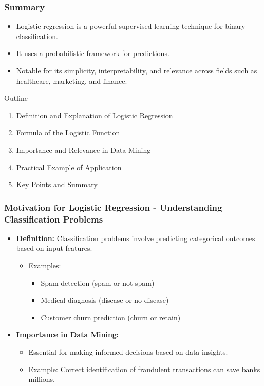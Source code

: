 \documentclass[aspectratio=169]{beamer}
\begin{document}
\begin{frame}[fragile]
    \frametitle{Summary}
    \begin{itemize}
        \item Logistic regression is a powerful supervised learning technique for binary classification.
        \item It uses a probabilistic framework for predictions.
        \item Notable for its simplicity, interpretability, and relevance across fields such as healthcare, marketing, and finance.
    \end{itemize}
    \begin{block}{Outline}
        \begin{enumerate}
            \item Definition and Explanation of Logistic Regression
            \item Formula of the Logistic Function
            \item Importance and Relevance in Data Mining
            \item Practical Example of Application
            \item Key Points and Summary
        \end{enumerate}
    \end{block}
\end{frame}

\begin{frame}[fragile]
    \frametitle{Motivation for Logistic Regression - Understanding Classification Problems}
    \begin{itemize}
        \item \textbf{Definition:} Classification problems involve predicting categorical outcomes based on input features.
        \begin{itemize}
            \item Examples: 
            \begin{itemize}
                \item Spam detection (spam or not spam)
                \item Medical diagnosis (disease or no disease)
                \item Customer churn prediction (churn or retain)
            \end{itemize}
        \end{itemize}
        \item \textbf{Importance in Data Mining:} 
        \begin{itemize}
            \item Essential for making informed decisions based on data insights.
            \item Example: Correct identification of fraudulent transactions can save banks millions.
        \end{itemize}
    \end{itemize}
\end{frame}
\end{document}
